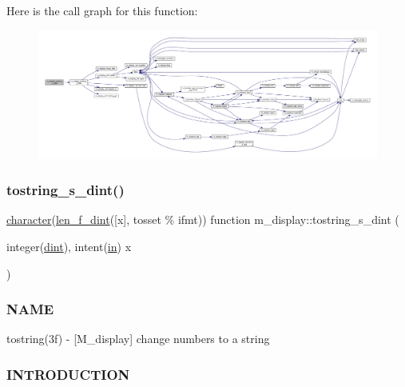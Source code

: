 Here is the call graph for this function\+:
\nopagebreak
\begin{figure}[H]
\begin{center}
\leavevmode
\includegraphics[width=350pt]{namespacem__display_ac0c020f1b9556f123bfea3ff29cda048_cgraph}
\end{center}
\end{figure}
\mbox{\label{namespacem__display_a5bfeb905fb5036068ef0012eb2f563fa}} 
\subsubsection{\texorpdfstring{tostring\+\_\+s\+\_\+dint()}{tostring\_s\_dint()}}
{\footnotesize\ttfamily \hyperlink{option__stopwatch_83_8txt_abd4b21fbbd175834027b5224bfe97e66}{character}(\hyperlink{namespacem__display_a6a2709cf5f243ee492f223b40c6b5143}{len\+\_\+f\+\_\+dint}(\mbox{[}x\mbox{]}, tosset \% ifmt)) function m\+\_\+display\+::tostring\+\_\+s\+\_\+dint (\begin{DoxyParamCaption}\item[{integer(\hyperlink{namespacem__display_a73f772e9702cad6f40b78364fde2c7cd}{dint}), intent(\hyperlink{M__journal_83_8txt_afce72651d1eed785a2132bee863b2f38}{in})}]{x }\end{DoxyParamCaption})\hspace{0.3cm}{\ttfamily [private]}}



\subsubsection*{N\+A\+ME}

tostring(3f) -\/ \mbox{[}M\+\_\+display\mbox{]} change numbers to a string 

\subsubsection*{I\+N\+T\+R\+O\+D\+U\+C\+T\+I\+ON}

